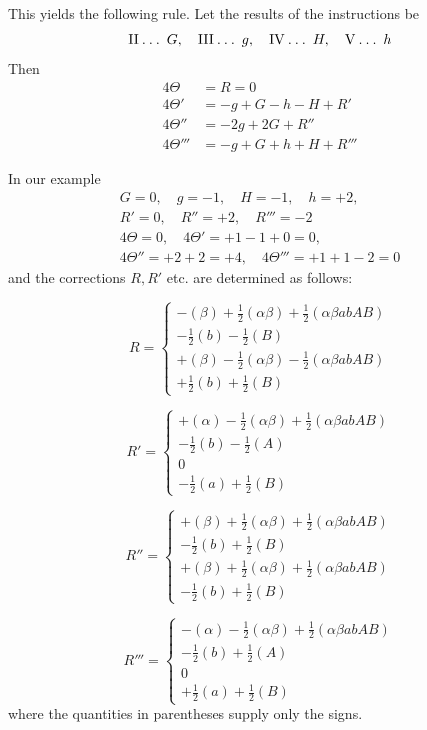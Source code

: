This yields the following rule. Let the results of the instructions be
\[
\mathrm{II}\mathbin{.}\mathbin{.}\mathbin{.}\;G,\quad
\mathrm{III}\mathbin{.}\mathbin{.}\mathbin{.}\;g,\quad
\mathrm{IV}\mathbin{.}\mathbin{.}\mathbin{.}\;H,\quad
\mathrm{V}\mathbin{.}\mathbin{.}\mathbin{.}\;h
\]
Then
\[
\begin{aligned}
4\Theta&=R=0\\
4\Theta'&=-g+G-h-H+R'\\
4\Theta''&=-2g+2G+R''\\
4\Theta'''&=-g+G+h+H+R'''
\end{aligned}
\]

In our example
\[
\begin{gathered}
G=0,\quad g=-1,\quad H=-1,\quad h=+2,\\
R'=0,\quad R''=+2,\quad R'''=-2\\
4\Theta=0,\quad4\Theta'=+1-1+0=0,\\
4\Theta''=+2+2=+4,\quad4\Theta'''=+1+1-2=0
\end{gathered}
\]
and the corrections $R,R'$ etc. are determined as follows:

\[
R=\left\{\begin{array}{l}
-(\beta)+\frac12(\alpha\beta)+\frac12(\alpha\beta abAB)\\
-\frac12(b)-\frac12(B)\\
+(\beta)-\frac12(\alpha\beta)-\frac12(\alpha\beta abAB)\\
+\frac12(b)+\frac12(B)
\end{array}\right.
\]

\[
R'=\left\{\begin{array}{l}
+(\alpha)-\frac12(\alpha\beta)+\frac12(\alpha\beta abAB)\\
-\frac12(b)-\frac12(A)\\
0\\
-\frac12(a)+\frac12(B)
\end{array}\right.
\]

\[
R''=\left\{\begin{array}{l}
+(\beta)+\frac12(\alpha\beta)+\frac12(\alpha\beta abAB)\\
-\frac12(b)+\frac12(B)\\
+(\beta)+\frac12(\alpha\beta)+\frac12(\alpha\beta abAB)\\
-\frac12(b)+\frac12(B)
\end{array}\right.
\]

\[
R'''=\left\{\begin{array}{l}
-(\alpha)-\frac12(\alpha\beta)+\frac12(\alpha\beta abAB)\\
-\frac12(b)+\frac12(A)\\
0\\
+\frac12(a)+\frac12(B)
\end{array}\right.
\]
where the quantities in parentheses supply only the signs.

